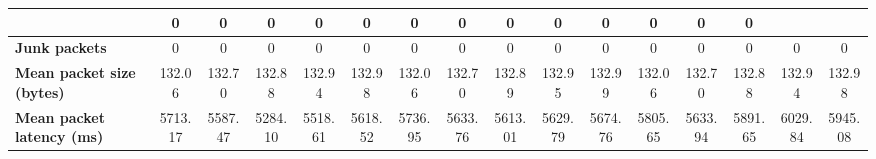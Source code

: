 \begin{table}[!h]
{\begin{tabular}{|l|ccccc|ccccc|ccccc|}
            & \multicolumn{1}{c|}{0}
            & \multicolumn{1}{c|}{0}
            & \multicolumn{1}{c|}{0}
            & \multicolumn{1}{c|}{0}
            & \multicolumn{1}{c|}{0}
            & \multicolumn{1}{c|}{0}
            & \multicolumn{1}{c|}{0}
            & \multicolumn{1}{c|}{0}
            & \multicolumn{1}{c|}{0}
            & \multicolumn{1}{c|}{0}
            & \multicolumn{1}{c|}{0}
            & \multicolumn{1}{c|}{0}
            & \multicolumn{1}{c|}{0}
            \\ \hline
            \textbf{Junk packets} & \multicolumn{1}{c|}{0} & \multicolumn{1}{c|}{0} & \multicolumn{1}{c|}{0}
            & \multicolumn{1}{c|}{0}
            & \multicolumn{1}{c|}{0}
            & \multicolumn{1}{c|}{0}
            & \multicolumn{1}{c|}{0}
            & \multicolumn{1}{c|}{0}
            & \multicolumn{1}{c|}{0}
            & \multicolumn{1}{c|}{0}
            & \multicolumn{1}{c|}{0}
            & \multicolumn{1}{c|}{0}
            & \multicolumn{1}{c|}{0}
            & \multicolumn{1}{c|}{0}
            & \multicolumn{1}{c|}{0}
            \\ \hline
            \textbf{Mean packet size (bytes)} & \multicolumn{1}{c|}{132.06} & \multicolumn{1}{c|}{132.70}
            & \multicolumn{1}{c|}{132.88}
            & \multicolumn{1}{c|}{132.94}
            & \multicolumn{1}{c|}{132.98}
            & \multicolumn{1}{c|}{132.06}
            & \multicolumn{1}{c|}{132.70}
            & \multicolumn{1}{c|}{132.89}
            & \multicolumn{1}{c|}{132.95}
            & \multicolumn{1}{c|}{132.99}
            & \multicolumn{1}{c|}{132.06}
            & \multicolumn{1}{c|}{132.70}
            & \multicolumn{1}{c|}{132.88}
            & \multicolumn{1}{c|}{132.94}
            & \multicolumn{1}{c|}{132.98}
            \\ \hline
            \textbf{Mean packet latency (ms)} & \multicolumn{1}{c|}{5713.17} & \multicolumn{1}{c|}{5587.47}
            & \multicolumn{1}{c|}{5284.10}
            & \multicolumn{1}{c|}{5518.61}
            & \multicolumn{1}{c|}{5618.52}
            & \multicolumn{1}{c|}{5736.95}
            & \multicolumn{1}{c|}{5633.76}
            & \multicolumn{1}{c|}{5613.01}
            & \multicolumn{1}{c|}{5629.79}
            & \multicolumn{1}{c|}{5674.76}
            & \multicolumn{1}{c|}{5805.65}
            & \multicolumn{1}{c|}{5633.94}
            & \multicolumn{1}{c|}{5891.65}
            & \multicolumn{1}{c|}{6029.84}
            & \multicolumn{1}{c|}{5945.08}
            \\ \hline

\end{tabular}}
\end{table}
